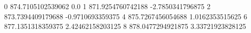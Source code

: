 0 874.7105102539062 0.0
1 871.9254760742188 -2.7850341796875
2 873.7394409179688 -0.9710693359375
4 875.7267456054688 1.0162353515625
6 877.1351318359375 2.42462158203125
8 878.0477294921875 3.33721923828125
